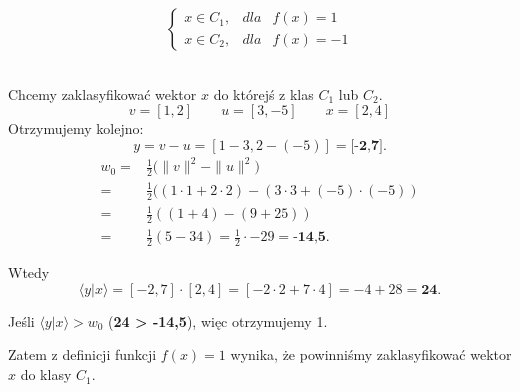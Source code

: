 \begin{equation}
\left\{\begin{matrix}
x \in C_{1}, & dla  & f(x) = 1 \\ 
x \in C_{2},& dla & f(x) = -1
\end{matrix}\right.
\end{equation}
\\
\begin{przyklad}
Chcemy zaklasyfikować wektor $x$ do którejś z klas $C_{1}$ lub ${C_{2}}$.
\\

\begin{equation*}
v = [1,2]  \qquad u =[3, -5] \qquad x = [2,4]
\end{equation*}
Otrzymujemy kolejno:
\begin{equation}
    y =  v - u = [1 - 3 , 2 -(-5)] = \textbf{[-2,7]}.
\end{equation}
\begin{align}
       w_{0} = &  \frac{1}{2} \big(\|v\|^{2} - \|u\|^{2}\big)  \\ 
        = &\frac{1}{2}((1 \cdot 1 + 2 \cdot 2) - (3 \cdot 3 + (-5) \cdot (-5))  \\
        = & \frac{1}{2}((1 + 4) - (9 + 25))   \\
       = &\frac{1}{2}(5 - 34) = \frac{1}{2} \cdot -29 = \textbf{-14,5}.
    \end{align}


Wtedy
\begin{equation}
    \big \langle y|x  \big \rangle = [-2,7] \cdot [2,4]
    = [-2 \cdot 2 + 7 \cdot 4] = -4 + 28 = \textbf{24}.
\end{equation}

\begin{center}
Jeśli $ \big \langle y|x \big \rangle > w_{0}$ (\textbf{24 > -14,5}), więc otrzymujemy 1.
\end{center}

Zatem z definicji funkcji $f(x) = 1$ wynika, że powinniśmy zaklasyfikować wektor $x$ do klasy $C_{1}$.
\end{przyklad}